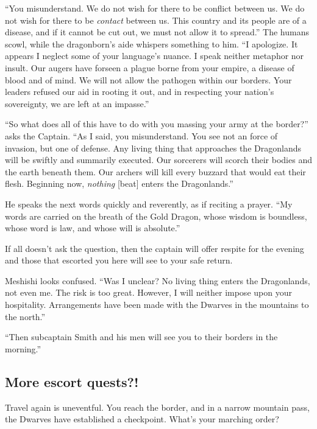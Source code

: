 \begin{multicols}{2}
  \begin{aloud}
  ``You misunderstand.
    We do not wish for there to be conflict between us.
    We do not wish for there to be \emph{contact} between us.
    This country and its people are of a disease,
      and if it cannot be cut out, we must not allow it to spread.''
    The humans scowl, while the dragonborn's aide whispers something to him.
  ``I apologize.
    It appears I neglect some of your language's nuance.
    I speak neither metaphor nor insult.
    Our augers have forseen a plague borne from your empire, a disease of blood and of mind.
    We will not allow the pathogen within our borders.
    Your leaders refused our aid in rooting it out, and in respecting your nation's sovereignty,
      we are left at an impasse.''

  ``So what does all of this have to do with you massing your army at the border?''
     asks the Captain.
  ``As I said, you misunderstand.
    You see not an force of invasion, but one of defense.
    Any living thing that approaches the Dragonlands will be swiftly and summarily executed.
    Our sorcerers will scorch their bodies and the earth beneath them.
    Our archers will kill every buzzard that would eat their flesh.
    Beginning now, \emph{nothing} [beat] enters the Dragonlands.''

    He speaks the next words quickly and reverently, as if reciting a prayer.
  ``My words are carried on the breath of the Gold Dragon,
      whose wisdom is boundless, whose word is law, and whose will is absolute.''
  \end{aloud}

If all doesn't ask the question, then the captain will offer respite for the evening and
  those that escorted you here will see to your safe return.

Meshishi looks confused.
``Was I unclear?
  No living thing enters the Dragonlands, not even me.
  The risk is too great.
  However, I will neither impose upon your hospitality.
  Arrangements have been made with the Dwarves in the mountains to the north.''

``Then subcaptain Smith and his men will see you to their borders in the morning.''

\subsection{More escort quests?!}

Travel again is uneventful.
You reach the border, and in a narrow mountain pass, the Dwarves have established a checkpoint.
What's your marching order?


\end{multicols}

